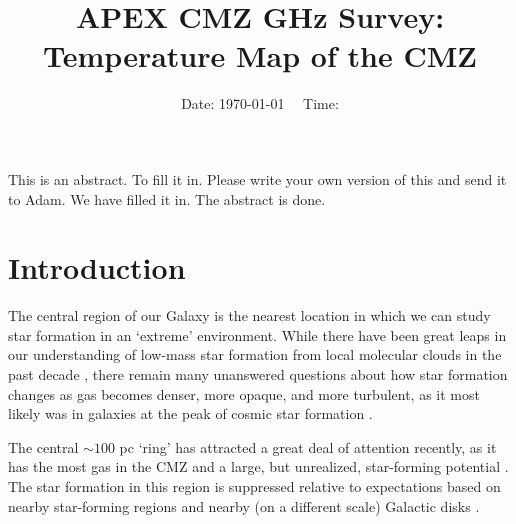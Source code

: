 



\title{APEX CMZ  GHz Survey: Temperature Map of the CMZ}


\date{Date: \today ~~ Time: \currenttime}

\abstract
{This is an abstract.}
{To fill it in.}
{Please write your own version of this and send it to Adam.}
{We have filled it in.}
{The abstract is done.}



\maketitle


\section{Introduction}
The central region of our Galaxy is the nearest location in which we can study
star formation in an `extreme' environment.  While there have been great leaps
in our understanding of low-mass star formation from local molecular clouds in
the past decade \citep{Lada2012a,Heiderman2010a,Lada2010a}, there remain many
unanswered questions about how star formation changes as gas becomes denser,
more opaque, and more turbulent, as it most likely was in galaxies at the peak
of cosmic star formation \citep{Kruijssen2013a}.


The central $\sim100$ pc `ring' \citep{Sofue1995a,Molinari2011a} has attracted
a great deal of attention recently, as it has the most gas in the CMZ and a
large, but unrealized, star-forming potential
\citep{Longmore2013a,Longmore2012b,Longmore2012a,Kruijssen2013a,Yusef-Zadeh2009a,Immer2012a}.
The star formation in this region is suppressed relative to expectations based
on nearby star-forming regions and nearby (on a different scale) Galactic disks
\citep{Kennicutt1998a,Kennicutt2012a,Leroy2013a,Heiderman2010a}.

